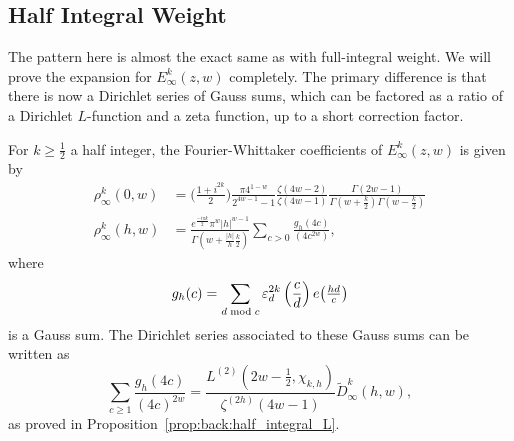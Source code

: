 \subsection{Half Integral Weight}\label{ssec:half_integral_eisenstein}

The pattern here is almost the exact same as with full-integral weight.
We will prove the expansion for $E_\infty^k(z,w)$ completely.
The primary difference is that there is now a Dirichlet series of Gauss sums, which can be
factored as a ratio of a Dirichlet $L$-function and a zeta function, up to a short
correction factor.

\begin{claim}
  For $k \geq \frac{1}{2}$ a half integer, the Fourier-Whittaker coefficients of $E_\infty^k(z,w)$ is given by
  \begin{align}
    \rho_\infty^k(0,w) &= \bigg( \frac{1+i^{2k}}{2} \bigg) \frac{\pi 4^{1-w}}{2^{4w - 1} - 1}
    \frac{\zeta(4w - 2)}{\zeta(4w - 1)}
    \frac{\Gamma(2w - 1)}{\Gamma(w + \frac{k}{2}) \Gamma(w - \frac{k}{2})}
    \\
    \rho_\infty^k(h,w) &= \frac{e^{\frac{-i\pi k}{2}} \pi^w \lvert h \rvert^{w-1}}
    {\Gamma(w + \frac{\lvert h \rvert}{h} \frac{k}{2})}
    \sum_{c > 0} \frac{g_h(4c)}{(4c^{2w})},
  \end{align}
  where
  \begin{equation}
    g_h(c) = \sum_{d \bmod c} \varepsilon_d^{2k} \left(\frac{c}{d}\right) e \big( \tfrac{hd}{c} \big)
  \end{equation}
  is a Gauss sum.
  The Dirichlet series associated to these Gauss sums can be written
  as
  \begin{equation}
    \sum_{c \geq 1} \frac{g_h(4c)}{(4c)^{2w}}
    =
    \frac{L^{(2)} (2w - \frac{1}{2}, \chi_{k,h})}{\zeta^{(2h)}(4w-1)}
    \widetilde{D}_\infty^k(h,w),
  \end{equation}
  as proved in Proposition~\ref{prop:back:half_integral_L}.
\end{claim}

